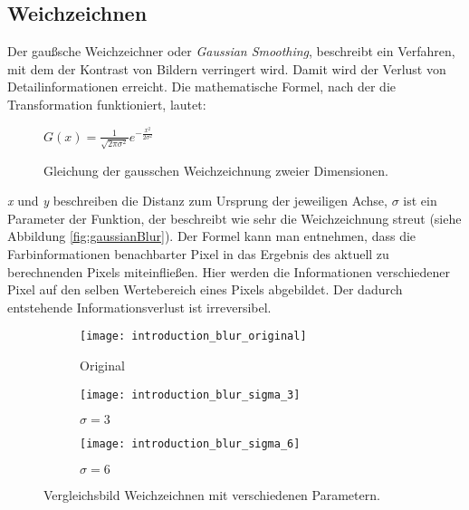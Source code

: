 \subsection{Weichzeichnen}
Der gaußsche Weichzeichner oder \textit{Gaussian Smoothing}, beschreibt ein Verfahren, mit dem der Kontrast von Bildern
verringert wird. Damit wird der Verlust von Detailinformationen erreicht. Die mathematische Formel, nach der die
Transformation funktioniert, lautet:

\parskip\baselineskip

\begin{figure}[H]
    \centering
    \(G(x) = \frac{1}{\sqrt{2 \pi \sigma^2}} e^{-\frac{x^2}{2 \sigma^2}}\)
    \caption{Gleichung der gausschen Weichzeichnung zweier Dimensionen.}
    \label{fig:func-blur}
\end{figure}


\par
\par

\textit{x} und \textit{y} beschreiben die Distanz zum Ursprung der jeweiligen Achse, \textit{\(\sigma\)} ist ein Parameter der Funktion, der
beschreibt wie sehr die Weichzeichnung streut (siehe Abbildung \space \vref*{fig:gaussianBlur}).
Der Formel kann man entnehmen, dass die
Farbinformationen benachbarter Pixel in das Ergebnis des aktuell zu berechnenden Pixels miteinfließen. Hier werden
die Informationen verschiedener Pixel auf den selben Wertebereich eines Pixels abgebildet. Der dadurch entstehende
Informationsverlust ist irreversibel.

\captionsetup[subfigure]{labelformat=empty, labelsep=none}
\begin{figure}[H]
    \centering
    \begin{subfigure}{0.3\textwidth}
        \texttt{[image: introduction\_blur\_original]}
        \caption{\small Original}
    \end{subfigure}
    \begin{subfigure}{0.3\textwidth}
        \texttt{[image: introduction\_blur\_sigma\_3]}
        \caption{\small \(\sigma = 3\)}
    \end{subfigure}
    \begin{subfigure}{0.3\textwidth}
        \texttt{[image: introduction\_blur\_sigma\_6]}
        \caption{\small \(\sigma = 6\)}
    \end{subfigure}

    \caption{Vergleichsbild Weichzeichnen mit verschiedenen Parametern.}
    \label{fig:gaussianBlur}
\end{figure}

